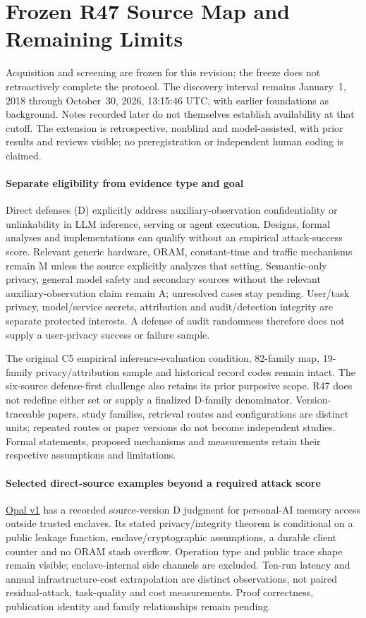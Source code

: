 \section{Frozen R47 Source Map and Remaining Limits}\label{sec:r47-frozen-map}
Acquisition and screening are frozen for this revision; the freeze does not retroactively complete the protocol. The discovery interval remains January~1, 2018 through October~30, 2026, 13:15:46 UTC, with earlier foundations as background. Notes recorded later do not themselves establish availability at that cutoff. The extension is retrospective, nonblind and model-assisted, with prior results and reviews visible; no preregistration or independent human coding is claimed.

\paragraph{Separate eligibility from evidence type and goal}
Direct defenses (D) explicitly address auxiliary-observation confidentiality or unlinkability in LLM inference, serving or agent execution. Designs, formal analyses and implementations can qualify without an empirical attack-success score. Relevant generic hardware, ORAM, constant-time and traffic mechanisms remain M unless the source explicitly analyzes that setting. Semantic-only privacy, general model safety and secondary sources without the relevant auxiliary-observation claim remain A; unresolved cases stay pending. User/task privacy, model/service secrets, attribution and audit/detection integrity are separate protected interests. A defense of audit randomness therefore does not supply a user-privacy success or failure sample.

The original C5 empirical inference-evaluation condition, 82-family map, 19-family privacy/attribution sample and historical record codes remain intact. The six-source defense-first challenge also retains its prior purposive scope. R47 does not redefine either set or supply a finalized D-family denominator. Version-traceable papers, study families, retrieval routes and configurations are distinct units; repeated routes or paper versions do not become independent studies. Formal statements, proposed mechanisms and measurements retain their respective assumptions and limitations.

\paragraph{Selected direct-source examples beyond a required attack score}
\href{https://arxiv.org/html/2604.02522v1}{Opal v1} has a recorded source-version D judgment for personal-AI memory access outside trusted enclaves. Its stated privacy/integrity theorem is conditional on a public leakage function, enclave/cryptographic assumptions, a durable client counter and no ORAM stash overflow. Operation type and public trace shape remain visible; enclave-internal side channels are excluded. Ten-run latency and annual infrastructure-cost extrapolation are distinct observations, not paired residual-attack, task-quality and cost measurements. Proof correctness, publication identity and family relationships remain pending.

